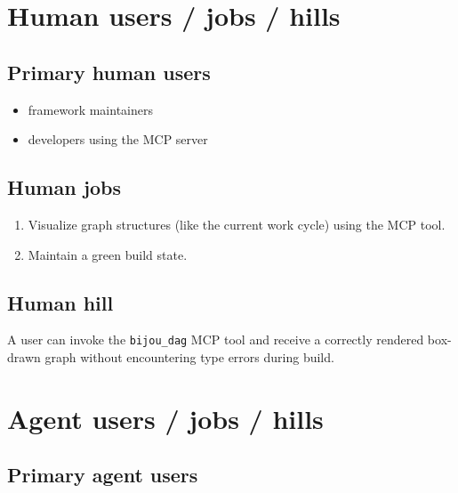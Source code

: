 \section{Human users / jobs / hills}\label{record-251-human-users-jobs-hills}

\subsection{Primary human users}\label{record-251-primary-human-users}

\begin{itemize}
\tightlist
\item
  framework maintainers
\item
  developers using the MCP server
\end{itemize}

\subsection{Human jobs}\label{record-251-human-jobs}

\begin{enumerate}
\def\labelenumi{\arabic{enumi}.}
\tightlist
\item
  Visualize graph structures (like the current work cycle) using the MCP tool.
\item
  Maintain a green build state.
\end{enumerate}

\subsection{Human hill}\label{record-251-human-hill}

A user can invoke the \texttt{b\allowbreak{}i\allowbreak{}j\allowbreak{}o\allowbreak{}u\allowbreak{}\_\allowbreak{}d\allowbreak{}a\allowbreak{}g} MCP tool and receive a correctly rendered box-drawn graph without encountering type errors during build.

\section{Agent users / jobs / hills}\label{record-251-agent-users-jobs-hills}

\subsection{Primary agent users}\label{record-251-primary-agent-users}

